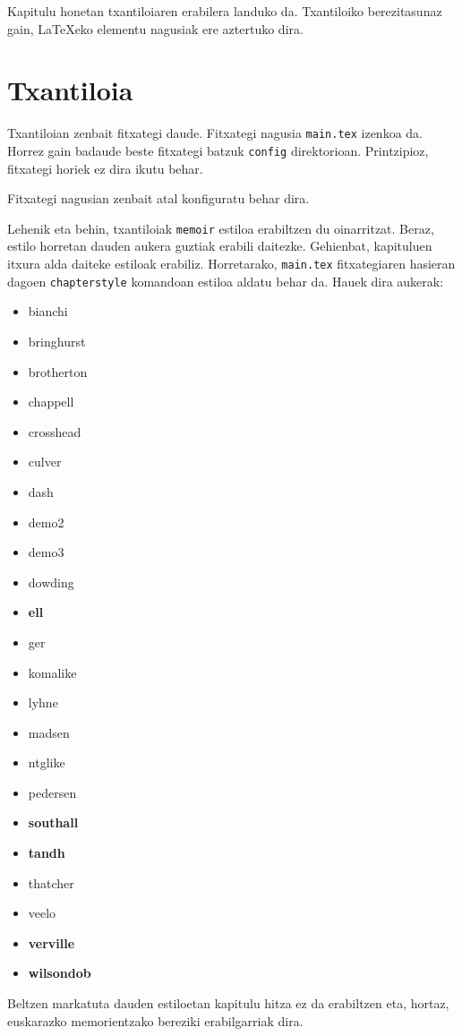 Kapitulu honetan txantiloiaren erabilera landuko da. Txantiloiko berezitasunaz gain, \LaTeX eko elementu nagusiak ere aztertuko dira. 

\section{Txantiloia}

Txantiloian zenbait fitxategi daude. Fitxategi nagusia \texttt{main.tex} izenkoa da. Horrez gain badaude beste fitxategi batzuk \texttt{config} direktorioan. Printzipioz, fitxategi horiek ez dira ikutu behar.

Fitxategi nagusian zenbait atal konfiguratu behar dira.

Lehenik eta behin, txantiloiak \texttt{memoir} estiloa erabiltzen du oinarritzat. Beraz, estilo horretan dauden aukera guztiak erabili daitezke. Gehienbat, \cite{Rmanual} kapituluen itxura alda daiteke estiloak erabiliz. Horretarako, \texttt{main.tex} fitxategiaren hasieran dagoen \texttt{chapterstyle} komandoan estiloa aldatu behar da. Hauek dira aukerak:
\begin{itemize}
	\item bianchi
	\item bringhurst
	\item brotherton
	\item chappell
	\item crosshead
	\item culver
	\item dash
	\item demo2
	\item demo3
	\item dowding
	\item \textbf{ell}
	\item ger
	\item komalike
	\item lyhne
	\item madsen
	\item ntglike
	\item pedersen
	\item \textbf{southall}
	\item \textbf{tandh}
	\item thatcher
	\item veelo
	\item \textbf{verville}
	\item \textbf{wilsondob}
\end{itemize}

Beltzen markatuta dauden estiloetan kapitulu hitza ez da erabiltzen eta, hortaz, euskarazko memorientzako bereziki erabilgarriak dira.

